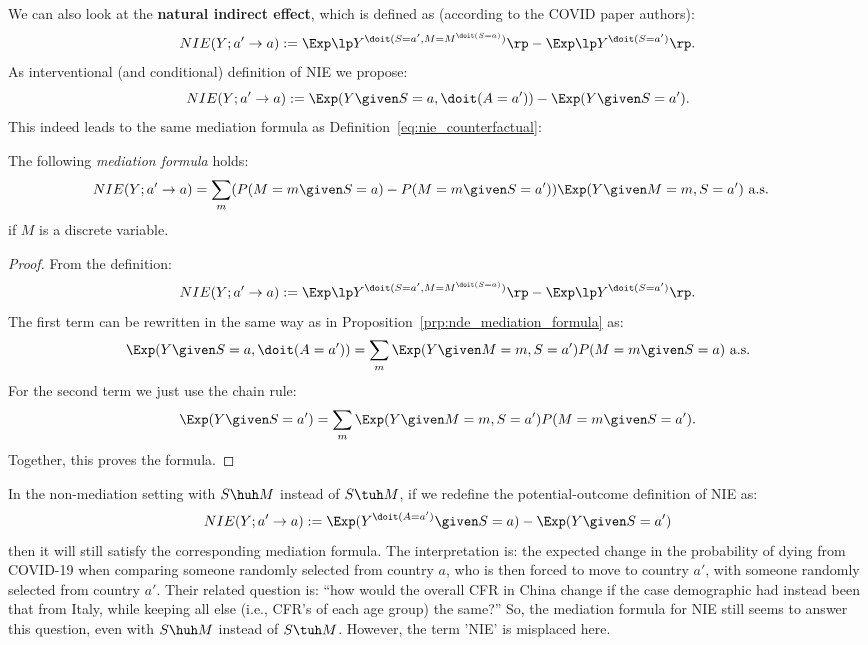 \begin{Rem}
  We can also look at the \textbf{natural indirect effect}, which is defined as (according to the COVID paper authors):
  \begin{equation}\label{eq:nie_counterfactual}
  NIE(Y; a' \to a) := \Exp \lp Y^{\doit(S=a',M=M^{\doit(S=a)})} \rp - \Exp \lp Y^{\doit(S=a')} \rp.
  \end{equation}
  As interventional (and conditional) definition of NIE we propose:
  \begin{equation}\label{eq:nie_interventional}
    NIE(Y; a' \to a) := \Exp(Y \given S=a, \doit(A=a')) - \Exp(Y \given S=a').
  \end{equation}
  This indeed leads to the same mediation formula as Definition~\ref{eq:nie_counterfactual}:
\begin{Prp}\label{prp:nie_mediation_formula}
  The following \emph{mediation formula} holds:
  \begin{equation}\label{eq:nie_mediation_formula}\begin{split}
    NIE(Y; a' \to a)
    &= \sum_m (P(M=m \given S=a) - P(M=m \given S=a')) \Exp(Y \given M=m,S=a') \text{ a.s.}
  \end{split}\end{equation}
  if $M$ is a discrete variable.
\end{Prp}
\begin{proof}
  From the definition:
    $$NIE(Y; a' \to a) := \Exp \lp Y^{\doit(S=a',M=M^{\doit(S=a)})} \rp - \Exp \lp Y^{\doit(S=a')} \rp.$$
  The first term can be rewritten in the same way as in Proposition~\ref{prp:nde_mediation_formula} as:
    \begin{equation*}
      \Exp(Y \given S=a, \doit(A=a')) = \sum_m \Exp(Y \given M=m, S=a') P(M=m \given S=a) \text{ a.s.}
    \end{equation*}
  For the second term we just use the chain rule:
    $$\Exp(Y \given S=a') = \sum_m \Exp(Y \given M=m, S=a') P(M=m \given S=a').$$
  Together, this proves the formula.
\end{proof}
In the non-mediation setting with $S \huh M$ instead of $S \tuh M$, if we redefine the potential-outcome definition of NIE as:
  \begin{equation}\label{eq:nie_counterfactual_conditional}
    NIE(Y; a' \to a) := \Exp(Y^{\doit(A=a')} \given S=a) - \Exp(Y \given S=a')
  \end{equation}
then it will still satisfy the corresponding mediation formula.
The interpretation is: the expected change in the probability of dying from COVID-19 when comparing someone randomly selected from country $a$, who is then forced to move to country $a'$, with someone randomly selected from country $a'$.
Their related question is: ``how would the overall CFR in China change if the case demographic had instead been that from Italy, while keeping all else (i.e., CFR's of each age group) the same?''
So, the mediation formula for NIE still seems to answer this question, even with $S \huh M$ instead of $S \tuh M$.
However, the term 'NIE' is misplaced here.


\end{Rem}
